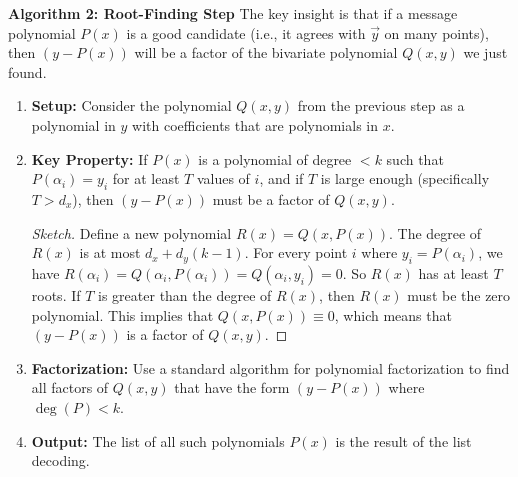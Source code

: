 \textbf{Algorithm 2: Root-Finding Step}
The key insight is that if a message polynomial $P(x)$ is a good candidate (i.e., it agrees with $\vec{y}$ on many points), then $(y - P(x))$ will be a factor of the bivariate polynomial $Q(x,y)$ we just found.
\begin{enumerate}
    \item \textbf{Setup:} Consider the polynomial $Q(x,y)$ from the previous step as a polynomial in $y$ with coefficients that are polynomials in $x$.
    \item \textbf{Key Property:} If $P(x)$ is a polynomial of degree $<k$ such that $P(\alpha_i) = y_i$ for at least $T$ values of $i$, and if $T$ is large enough (specifically $T > d_x$), then $(y-P(x))$ must be a factor of $Q(x,y)$.
    \begin{proof}[Sketch]
    Define a new polynomial $R(x) = Q(x, P(x))$. The degree of $R(x)$ is at most $d_x + d_y(k-1)$. For every point $i$ where $y_i = P(\alpha_i)$, we have $R(\alpha_i) = Q(\alpha_i, P(\alpha_i)) = Q(\alpha_i, y_i) = 0$. So $R(x)$ has at least $T$ roots. If $T$ is greater than the degree of $R(x)$, then $R(x)$ must be the zero polynomial. This implies that $Q(x, P(x)) \equiv 0$, which means that $(y-P(x))$ is a factor of $Q(x,y)$.
    \end{proof}
    \item \textbf{Factorization:} Use a standard algorithm for polynomial factorization to find all factors of $Q(x,y)$ that have the form $(y - P(x))$ where $\deg(P) < k$.
    \item \textbf{Output:} The list of all such polynomials $P(x)$ is the result of the list decoding.
\end{enumerate}
